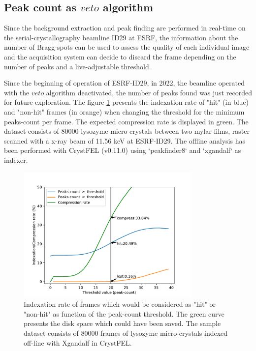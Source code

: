 \documentclass[preprint]{iucr}              %
\begin{document}
\subsection{Peak count as $veto$ algorithm}
Since the background extraction and peak finding are performed in real-time on the serial-crystallography beamline ID29 at ESRF, the information about the number of Bragg-spots can be used to assess the quality of each individual image and the acquisition system can decide to discard the frame depending on the number of peaks and a live-adjustable threshold. 

Since the beginning of operation of ESRF-ID29, in 2022, the beamline operated with the $veto$ algorithm deactivated, the number of peaks found was just recorded for future exploration. 
The figure \ref{veto-fig} presents the indexation rate of "hit" (in blue) and "non-hit" frames (in orange) when changing the threshold for the minimum peaks-count per frame. 
The expected compression rate is displayed in green.
The dataset consists of 80000 lysozyme micro-crystals between two mylar films, raster scanned with a x-ray beam of 11.56 keV at ESRF-ID29.
The offline analysis has been performed with CrystFEL (v0.11.0) using `peakfinder8` and `xgandalf` as indexer. 

\begin{figure}
\label{veto-fig}
\begin{center}
\includegraphics[width=9cm]{fig7/veto-fig}
\caption{Indexation rate of frames which would be considered as "hit" or "non-hit" as function of the peak-count threshold. 
The green curve presents the disk space which could have been saved.
The sample dataset consists of 80000 frames of lysozyme micro-crystals indexed off-line with Xgandalf in CrystFEL.}
\end{center}
\end{figure}

\end{document}
